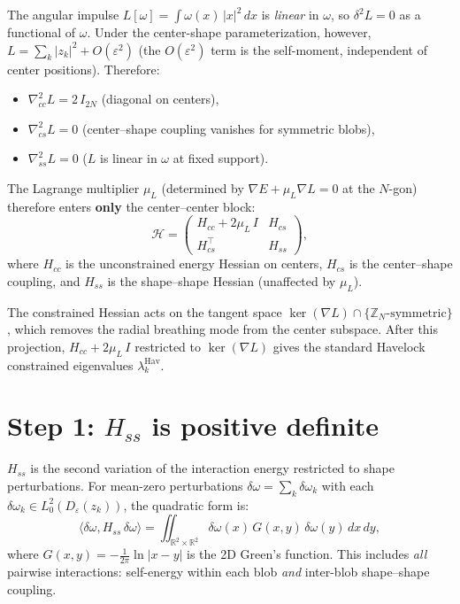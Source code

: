 \documentclass[11pt]{article}
\begin{document}
The angular impulse $L[\omega] = \int \omega(x)\,|x|^2\,dx$ is
\emph{linear} in $\omega$, so $\delta^2 L = 0$ as a functional of
$\omega$.  Under the center-shape parameterization, however,
$L = \sum_k |z_k|^2 + O(\varepsilon^2)$ (the $O(\varepsilon^2)$ term
is the self-moment, independent of center positions).  Therefore:
\begin{itemize}
  \item $\nabla^2_{cc} L = 2\,I_{2N}$ \quad (diagonal on centers),
  \item $\nabla^2_{cs} L = 0$ \quad (center--shape coupling vanishes
    for symmetric blobs),
  \item $\nabla^2_{ss} L = 0$ \quad ($L$ is linear in $\omega$ at fixed support).
\end{itemize}
The Lagrange multiplier $\mu_L$ (determined by
$\nabla E + \mu_L \nabla L = 0$ at the $N$-gon) therefore enters
\textbf{only} the center--center block:
\[
  \mathcal{H} = \begin{pmatrix}
    H_{cc} + 2\mu_L\,I & H_{cs} \\[3pt]
    H_{cs}^\top & H_{ss}
  \end{pmatrix},
\]
where $H_{cc}$ is the unconstrained energy Hessian on centers,
$H_{cs}$ is the center--shape coupling, and $H_{ss}$ is the
shape--shape Hessian (unaffected by $\mu_L$).

The constrained Hessian acts on the tangent space
$\ker(\nabla L) \cap \{\text{$\mathbb{Z}_N$-symmetric}\}$,
which removes the radial breathing mode from the center subspace.
After this projection, $H_{cc} + 2\mu_L\,I$ restricted to
$\ker(\nabla L)$ gives the standard Havelock constrained eigenvalues
$\lambda_k^{\mathrm{Hav}}$.

\section{Step 1: $H_{ss}$ is positive definite}

$H_{ss}$ is the second variation of the interaction energy
restricted to shape perturbations.  For mean-zero perturbations
$\delta\omega = \sum_k \delta\omega_k$ with each
$\delta\omega_k \in L^2_0(D_\varepsilon(z_k))$, the quadratic form is:
\[
  \langle \delta\omega, H_{ss}\,\delta\omega \rangle
  = \iint_{\mathbb{R}^2 \times \mathbb{R}^2}
    \delta\omega(x)\,G(x,y)\,\delta\omega(y)\,dx\,dy,
\]
where $G(x,y) = -\frac{1}{2\pi}\ln|x - y|$ is the 2D Green's function.
This includes \emph{all} pairwise interactions: self-energy within each
blob \emph{and} inter-blob shape--shape coupling.
\end{document}
